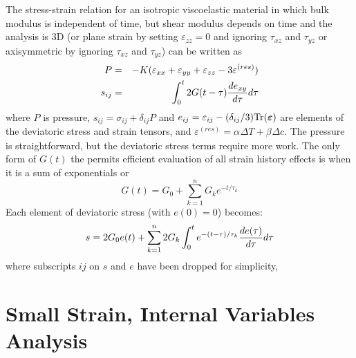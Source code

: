 \documentclass[11pt]{book}
\newcommand{\tens}[1]{\boldsymbol{\mathsf{#1}}}
\def\a#1{\alpha_{#1}}
\def\b#1{\beta_{#1}}
\def\DT{\Delta T}
\def\e#1{\varepsilon_{#1}}
\def\er#1{\varepsilon_{#1}^{(res)}}
\def\t#1{\tau_{#1}}
\begin{document}
The stress-strain relation for an isotropic viscoelastic material in which bulk modulus is independent of time, but shear modulus depends on time and the analysis is 3D (or plane strain by setting $\e{zz}=0$ and ignoring $\t{xz}$ and $\t{yz}$ or axisymmetric by ignoring $\t{xz}$ and $\t{yz}$) can be written as
\begin{eqnarray}
      P & = & -K(\e{xx} + \e{yy} + \e{zz} - 3\er{})  \\
      s_{ij} & = & \int_0^t 2G(t-\tau) {de_{xy}\over d\tau} d\tau
\end{eqnarray}
where $P$ is pressure, $s_{ij} = \sigma_{ij}+\delta_{ij}P$ and $e_{ij} = \varepsilon_{ij} - (\delta_{ij}/3){\rm Tr}( \tens\varepsilon)$ are elements of the deviatoric stress and strain tensors, and $\er{} = \a{}\DT + \b{}\Delta c$.
The pressure is straightforward, but the deviatoric stress terms require more work. The only form of $G(t)$ the permits efficient evaluation of all strain history effects is when it is a sum of exponentials or
\begin{equation}
        G(t) = G_0 + \sum_{k=1}^n G_k e^{-t/\tau_k}
\end{equation}
Each element of deviatoric stress (with $e(0)=0$) becomes:
\begin{equation}
     s = 2G_0 e(t) + \sum_{k=1}^n 2 G_k \int_0^t e^{-(t-\tau)/\tau_k} {de(\tau)\over d\tau} d\tau
\end{equation}
where subscripts $ij$ on $s$ and $e$ have been dropped for simplicity,

\section{Small Strain, Internal Variables Analysis}
\end{document}
